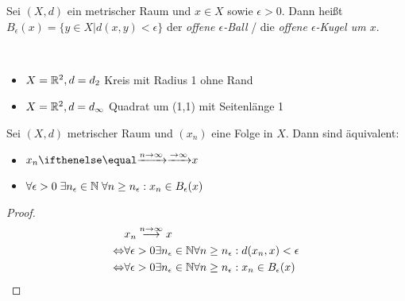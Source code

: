 \begin{Definition}%
	Sei $(X,d)$ ein metrischer Raum und $x \in X$ sowie $\epsilon > 0$. Dann heißt 
	$B_\epsilon (x) = \{ y \in X \vert d(x,y) < \epsilon\}$ der \emph{offene 
	$\epsilon$-Ball} / die \emph{offene $\epsilon$-Kugel um $x$}.
\end{Definition}

\begin{Beispiel}~
	\begin{itemize}
		\item $X = \mathbb{R}^2, d = d_2$ Kreis mit Radius 1 ohne Rand
		\item $X = \mathbb{R}^2, d = d_\infty$ Quadrat um (1,1) mit Seitenlänge 1
	\end{itemize}
\end{Beispiel}

\begin{Lemma}{\label{vl_21_lemma_2}%
	Sei $(X,d)$ metrischer Raum und $(x_n)$ eine Folge in $X$. Dann sind äquivalent:
	\begin{itemize}
		\item $x_n \toinfty x$
		\item $\forall \epsilon > 0 \; \exists n_\epsilon \in \mathbb{N} \; \forall n \geq n_\epsilon  
			: x_n \in B_\epsilon (x)$
	\end{itemize}
}\end{Lemma}

\begin{proof}
	\begin{align*}
		& x_n \overset{n\rightarrow \infty}{\longrightarrow} x \\
		\Leftrightarrow & \forall \epsilon > 0 
			\exists n_\epsilon \in \mathbb{N} \forall n \geq n_\epsilon: 
			d(x_n,x) < \epsilon \\
		\Leftrightarrow & \forall \epsilon > 0 \exists n_\epsilon \in \mathbb{N} \forall n \geq 
	n_\epsilon: x_n \in B_\epsilon(x)
	\end{align*} 
\end{proof}

